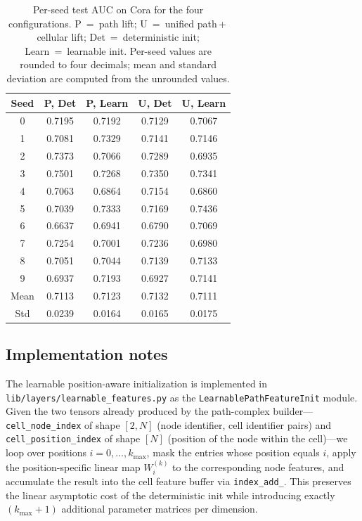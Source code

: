 \documentclass{article}
\begin{document}
\begin{table}[h]
  \centering
  \caption{Per-seed test AUC on Cora for the four configurations. P~=~path lift; U~=~unified path\,+\,cellular lift; Det~=~deterministic init; Learn~=~learnable init. Per-seed values are rounded to four decimals; mean and standard deviation are computed from the unrounded values.}
  \label{tab:per-seed}
  \begin{tabular}{ccccc}
    \toprule
    Seed & P, Det & P, Learn & U, Det & U, Learn \\
    \midrule
    0 & 0.7195 & 0.7192 & 0.7129 & 0.7067 \\
    1 & 0.7081 & 0.7329 & 0.7141 & 0.7146 \\
    2 & 0.7373 & 0.7066 & 0.7289 & 0.6935 \\
    3 & 0.7501 & 0.7268 & 0.7350 & 0.7341 \\
    4 & 0.7063 & 0.6864 & 0.7154 & 0.6860 \\
    5 & 0.7039 & 0.7333 & 0.7169 & 0.7436 \\
    6 & 0.6637 & 0.6941 & 0.6790 & 0.7069 \\
    7 & 0.7254 & 0.7001 & 0.7236 & 0.6980 \\
    8 & 0.7051 & 0.7044 & 0.7139 & 0.7133 \\
    9 & 0.6937 & 0.7193 & 0.6927 & 0.7141 \\
    \midrule
    Mean & 0.7113 & 0.7123 & 0.7132 & 0.7111 \\
    Std  & 0.0239 & 0.0164 & 0.0165 & 0.0175 \\
    \bottomrule
  \end{tabular}
\end{table}

\subsection{Implementation notes}
\label{app:impl}
The learnable position-aware initialization is implemented in \texttt{lib/layers/learnable\_features.py} as the \texttt{LearnablePathFeatureInit} module. Given the two tensors already produced by the path-complex builder---\texttt{cell\_node\_index} of shape $[2, N]$ (node identifier, cell identifier pairs) and \texttt{cell\_position\_index} of shape $[N]$ (position of the node within the cell)---we loop over positions $i = 0, \ldots, k_\text{max}$, mask the entries whose position equals $i$, apply the position-specific linear map $W_i^{(k)}$ to the corresponding node features, and accumulate the result into the cell feature buffer via \texttt{index\_add\_}. This preserves the linear asymptotic cost of the deterministic init while introducing exactly $(k_\text{max} + 1)$ additional parameter matrices per dimension.
\end{document}
